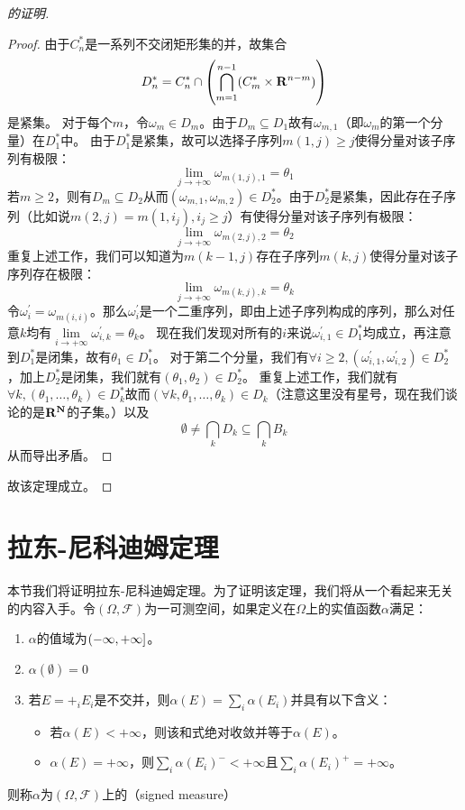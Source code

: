 \documentclass[main.tex]{subfiles}
\begin{document}
\begin{proof}[的证明]
\begin{proof}
	由于\(C_n^*\)是一系列不交闭矩形集的并，故集合
	\[D_n^* = C_n^*\cap\del{\bigcap_{m=1}^{n-1}(C_m^*\times\R^{n-m})}\]
	是紧集。
	对于每个\(m\)，令\(\omega_m \in D_m\)。由于\(D_m \subseteq D_1\)故有\(\omega_{m,1}\)（即\(\omega_m\)的第一个分量）在\(D_1^*\)中。
	由于\(D_1^*\)是紧集，故可以选择子序列\(m(1,j)\geq j\)使得分量对该子序列有极限：
	\[\lim\limits_{j\rightarrow+\infty}\omega_{m(1,j),1} = \theta_1\]
	若\(m\geq 2\)，则有\(D_m \subseteq D_2\)从而\((\omega_{m,1}, \omega_{m,2}) \in D_2^*\)。由于\(D_2^*\)是紧集，因此存在子序列（比如说\(m(2,j) = m(1, i_j), i_j \geq j\)）有使得分量对该子序列有极限：
	\[\lim\limits_{j\rightarrow +\infty}\omega_{m(2, j),2} = \theta_2\]
	重复上述工作，我们可以知道为\(m(k-1, j)\)存在子序列\(m(k,j)\)使得分量对该子序列存在极限：
	\[\lim\limits_{j\rightarrow +\infty}\omega_{m(k, j),k} = \theta_k\]
	令\(\omega^\prime_i = \omega_{m(i,i)}\)。那么\(\omega^\prime_i\)是一个二重序列，即由上述子序列构成的序列，那么对任意\(k\)均有\(\lim\limits_{i\rightarrow +\infty} \omega^\prime_{i,k} = \theta_k\)。
	现在我们发现对所有的\(i\)来说\(\omega^\prime_{i,1} \in D_1^*\)均成立，再注意到\(D_1^*\)是闭集，故有\(\theta_1 \in D_1^*\)。
	对于第二个分量，我们有\(\forall i\geq 2, (\omega^\prime_{i,1}, \omega^\prime_{i,2}) \in D_2^*\)，加上\(D_2^*\)是闭集，我们就有\((\theta_1, \theta_2) \in D_2^*\)。
	重复上述工作，我们就有\(\forall k, (\theta_1, \dots, \theta_k) \in D_k^*\)故而\((\forall k, \theta_1, \dots, \theta_k)\in D_k\)（注意这里没有星号，现在我们谈论的是\(\mathbf{R}^{\mathbf{N}}\)的子集。）以及
	\[\emptyset \neq \bigcap_k D_k \subseteq \bigcap_k B_k\]
	从而导出矛盾。
\end{proof}
	故该定理成立。
\end{proof}
\section{拉东-尼科迪姆定理} \label{sec:a.4}
本节我们将证明拉东-尼科迪姆定理。为了证明该定理，我们将从一个看起来无关的内容入手。令\((\Omega, \mathcal{F})\)为一可测空间，如果定义在\(\Omega\)上的实值函数\(\alpha\)满足：
\begin{enumerate}
	\item \(\alpha\)的值域为\(\intoc{-\infty, +\infty}\)。
	\item \(\alpha(\emptyset) = 0\)
	\item 若\(E=+_i E_i\)是不交并，则\(\alpha(E) = \sum_i \alpha(E_i)\)并具有以下含义：
	\begin{itemize}
		\item 若\(\alpha(E)<+\infty\)，则该和式绝对收敛并等于\(\alpha(E)\)。
		\item \(\alpha(E)=+\infty\)，则\(\sum_i\alpha(E_i)^-<+\infty\)且\(\sum_i\alpha(E_i)^+=+\infty\)。
	\end{itemize}
\end{enumerate}
则称\(\alpha\)为\((\Omega, \mathcal{F})\)上的（signed measure）
\end{document}
